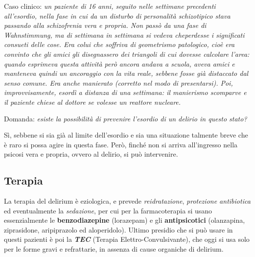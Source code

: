 Caso clinico: \emph{un paziente di 16 anni, seguito nelle settimane
precedenti all'esordio, nella fase in cui da un disturbo di personalità
schizotipico stava passando alla schizofrenia vera e propria. Non passò
da una fase di Wahnstimmung, ma di settimana in settimana si vedeva
cheperdesse i significati consueti delle cose. Era colui che soffriva di
geometrismo patologico, cioè era convinto che gli amici gli disegnassero
dei triangoli di cui dovesse calcolare l'area: quando esprimeva questa
attività però ancora andava a scuola, aveva amici e manteneva quindi un
ancoraggio con la vita reale, sebbene fosse già distaccato dal senso
comune. Era anche manierato (corretto nel modo di presentarsi). Poi,
improvvisamente, esordì a distanza di una settimana: il manierismo
scomparve e il paziente chiese al dottore se volesse un reattore
nucleare.}

Domanda: \emph{esiste la possibilità di prevenire l'esordio di un
delirio in questo stato? }

Sì, sebbene si sia già al limite dell'esordio e sia una situazione
talmente breve che è raro si possa agire in questa fase. Però, finché
non si arriva all'ingresso nella psicosi vera e propria, ovvero al
delirio, si può intervenire.

\subsection{Terapia}

La terapia del delirium è eziologica, e prevede \emph{reidratazione},
\emph{protezione antibiotica} ed eventualmente la \emph{sedazione}, per
cui per la farmacoterapia si usano essenzialmente le
\textbf{benzodiazepine} (lorazepam) e gli \textbf{antipsicotici}
(olanzapina, ziprasidone, aripiprazolo ed aloperidolo). Ultimo presidio
che si può usare in questi pazienti è poi la \textbf{\emph{TEC}}
(Terapia Elettro-Convulsivante), che oggi si usa solo per le forme gravi
e refrattarie, in assenza di cause organiche di delirium.
